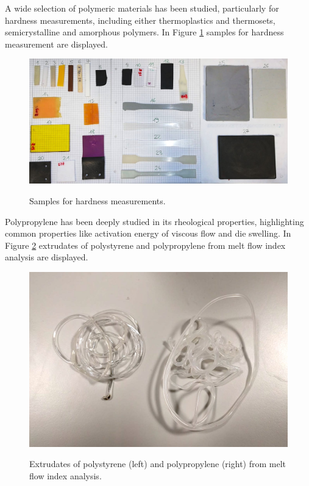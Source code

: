\documentclass[a4paper, 11pt]{article}
\begin{document}
A wide selection of polymeric materials has been studied, particularly for hardness measurements, including either thermoplastics and thermosets, semicrystalline and amorphous polymers. In Figure \ref{fig:rubber} samples for hardness measurement are displayed. 
\begin{figure}[h!]
	\centering
	{\includegraphics[scale=0.3]{rubber}}
	\captionsetup{justification=centering}
	\caption{Samples for hardness measurements.}
	\label{fig:rubber}
\end{figure}
\newpage
Polypropylene has been deeply studied in its rheological properties, highlighting common properties like activation energy of viscous flow and die swelling. In Figure \ref{fig:melt} extrudates of polystyrene and polypropylene from melt flow index analysis are displayed. 
\begin{figure}[h!]
	\centering
	{\includegraphics[scale=0.2]{melt}}
	\captionsetup{justification=centering}
	\caption{Extrudates of polystyrene (left) and polypropylene (right) from melt flow index analysis.}
	\label{fig:melt}
\end{figure}\\
\end{document}
